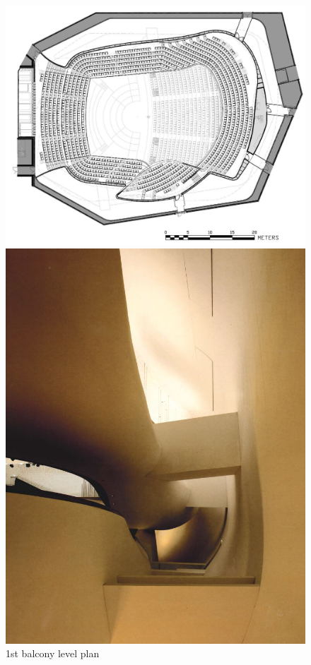 \begin{figure}[htbp]
 \begin{minipage}{0.5\hsize}
  \begin{center}
   \includegraphics[scale=0.15]{01_att/PLAN_1st_Balcony_Level.png}
  \end{center}
  \caption{\hspace{1mm}1st balcony level plan}
 \end{minipage}
 \begin{minipage}{0.5\hsize}
  \begin{center}
   \includegraphics[scale=0.19]{01_att/suspended.png}

\end{center}
\end{minipage}
\end{figure}
